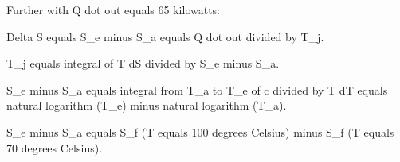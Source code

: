 Further with Q dot out equals 65 kilowatts:  

Delta S equals S_e minus S_a equals Q dot out divided by T_j.  

T_j equals integral of T dS divided by S_e minus S_a.  

S_e minus S_a equals integral from T_a to T_e of c divided by T dT equals natural logarithm (T_e) minus natural logarithm (T_a).  

S_e minus S_a equals S_f (T equals 100 degrees Celsius) minus S_f (T equals 70 degrees Celsius).